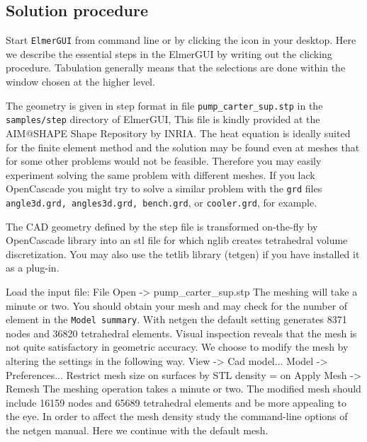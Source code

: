 \subsection*{Solution procedure}

Start \texttt{ElmerGUI} from command line or by clicking the icon in your desktop. Here we describe 
the essential steps in the ElmerGUI by writing out the clicking procedure. Tabulation generally means that the 
selections are done within the window chosen at the higher level. 

The geometry is given in step format in file \texttt{pump\_carter\_sup.stp}
in the \texttt{samples/step} directory of ElmerGUI, 
This file is kindly provided at the AIM@SHAPE Shape Repository by INRIA.
The heat equation is ideally suited for the finite element method and 
the solution may be found even at meshes that for some other problems
would not be feasible. Therefore you may easily experiment solving the same
problem with different meshes. If you lack OpenCascade you might try to solve a similar problem
with the \texttt{grd} files \texttt{angle3d.grd, angles3d.grd, 
bench.grd}, or \texttt{cooler.grd}, for example.

The CAD geometry defined by the step file is transformed on-the-fly by OpenCascade library into 
an stl file 
for which nglib creates tetrahedral volume discretization.
You may also use the tetlib library (tetgen) if you have installed it as a plug-in.

Load the input file:
\ttbegin
File 
  Open -> pump_carter_sup.stp
\ttend
The meshing will take a minute or two. 
You should obtain your mesh and may check for the number of element in the \texttt{Model summary}. 
With netgen the default setting generates 8371 nodes and 36820 tetrahedral elements. 
Visual inspection reveals that the mesh is not quite satisfactory in geometric accuracy.
We choose to modify the mesh by altering the settings in the following way.
\ttbegin
View -> Cad model...
  Model -> Preferences...
    Restrict mesh size on surfaces by STL density = on
    Apply
Mesh -> Remesh
\ttend
The meshing operation takes a minute or two. 
The modified mesh should include 16159 nodes and 65689 tetrahedral elements
and be more appealing to the eye.
In order to affect the mesh density study the command-line options of the netgen manual.
Here we continue with the default mesh.

